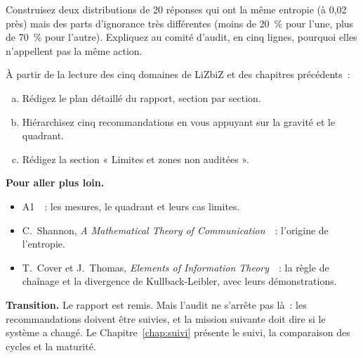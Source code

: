 \begin{boxexo}[title={\ding{45}\quad Exercice~11.9. Deux domaines, une entropie \niveauexpert}]
Construisez deux distributions de 20 réponses qui ont la même entropie (à
0,02 près) mais des parts d'ignorance très différentes (moins de 20~\%
pour l'une, plus de 70~\% pour l'autre). Expliquez au comité d'audit, en
cinq lignes, pourquoi elles n'appellent pas la même action.
\end{boxexo}

\begin{boxexo}[title={\ding{45}\quad Exercice~11.10. Le rapport d'AUDIX CONSEIL \niveauexpert}]
À partir de la lecture des cinq domaines de LiZbiZ et des chapitres
précédents~:
\begin{enumerate}[(a)]
    \item Rédigez le plan détaillé du rapport, section par section.
    \item Hiérarchisez cinq recommandations en vous appuyant sur la
          gravité et le quadrant.
    \item Rédigez la section « Limites et zones non auditées ».
\end{enumerate}
\end{boxexo}

\bigskip

\begin{boxinfo}
\textbf{Pour aller plus loin.}
\begin{itemize}
    \item A1~\cite{minka2026nek}~: les mesures, le quadrant et leurs cas
          limites.
    \item C.~Shannon, \textit{A Mathematical Theory of
          Communication}~\cite{shannon1948}~: l'origine de l'entropie.
    \item T.~Cover et J.~Thomas, \textit{Elements of Information
          Theory}~\cite{cover2006elements}~: la règle de chaînage et la
          divergence de Kullback-Leibler, avec leurs démonstrations.
\end{itemize}
\end{boxinfo}

\begin{boxinfo}
\textbf{Transition.} Le rapport est remis. Mais l'audit ne s'arrête pas là~:
les recommandations doivent être suivies, et la mission suivante doit dire
si le système a changé. Le Chapitre~\ref{chap:suivi} présente le suivi, la
comparaison des cycles et la maturité.
\end{boxinfo}
